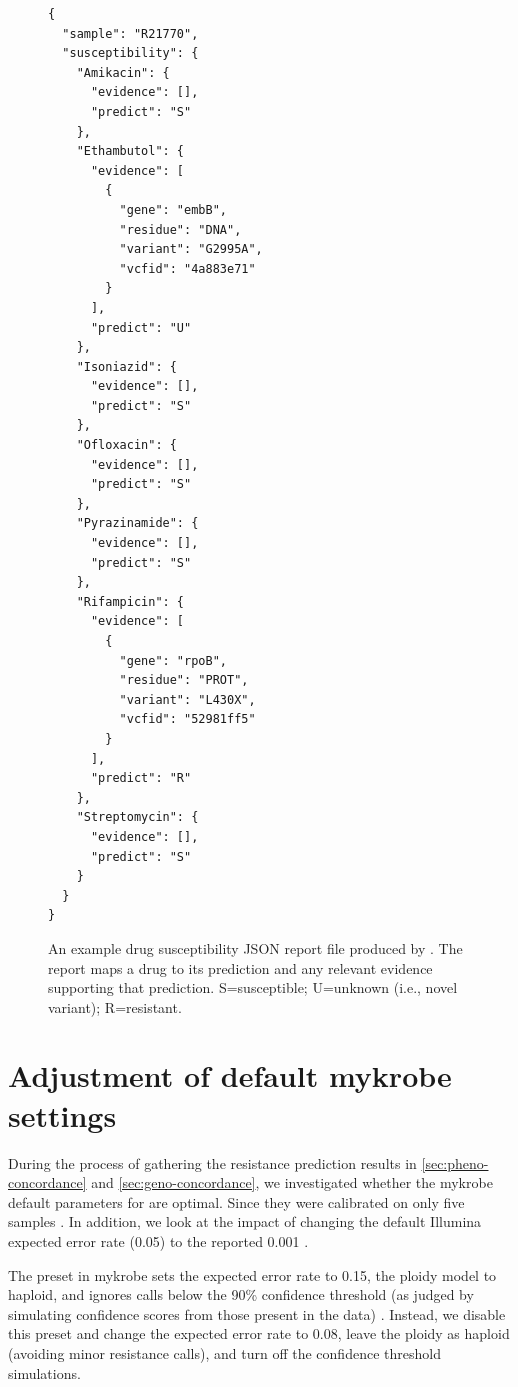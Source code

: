 \begin{figure}
\begin{verbatim}
{
  "sample": "R21770",
  "susceptibility": {
    "Amikacin": {
      "evidence": [],
      "predict": "S"
    },
    "Ethambutol": {
      "evidence": [
        {
          "gene": "embB",
          "residue": "DNA",
          "variant": "G2995A",
          "vcfid": "4a883e71"
        }
      ],
      "predict": "U"
    },
    "Isoniazid": {
      "evidence": [],
      "predict": "S"
    },
    "Ofloxacin": {
      "evidence": [],
      "predict": "S"
    },
    "Pyrazinamide": {
      "evidence": [],
      "predict": "S"
    },
    "Rifampicin": {
      "evidence": [
        {
          "gene": "rpoB",
          "residue": "PROT",
          "variant": "L430X",
          "vcfid": "52981ff5"
        }
      ],
      "predict": "R"
    },
    "Streptomycin": {
      "evidence": [],
      "predict": "S"
    }
  }
}
\end{verbatim}
\caption{An example drug susceptibility JSON report file produced by \drprg{}. The report maps a drug to its prediction and any relevant evidence supporting that prediction. S=susceptible; U=unknown (i.e., novel variant); R=resistant.}
\label{fig:example-drprg-report}
\end{figure}

\section{Adjustment of default mykrobe \ont{} settings}
\label{app:mykrobe-settings}

During the process of gathering the resistance prediction results in \autoref{sec:pheno-concordance} and \autoref{sec:geno-concordance}, we investigated whether the mykrobe default parameters for \ont{} are optimal. Since they were calibrated on only five samples \cite{hunt2019}. In addition, we look at the impact of changing the default Illumina expected error rate (0.05) to the reported 0.001 \cite{manley2016}.

The \ont{} preset in mykrobe sets the expected error rate to 0.15, the ploidy model to haploid, and ignores calls below the 90\% confidence threshold (as judged by simulating confidence scores from those present in the data) \cite{hunt2019}. Instead, we disable this preset and change the expected error rate to 0.08, leave the ploidy as haploid (avoiding minor resistance calls), and turn off the confidence threshold simulations.


